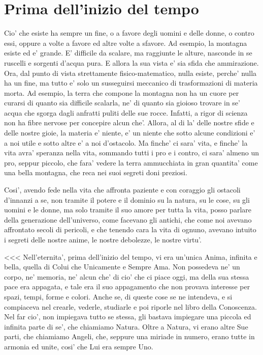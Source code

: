 \section{Prima dell'inizio del tempo}
Cio' che esiste ha sempre un fine, o a favore degli uomini e delle donne, o contro essi, oppure a volte a favore ed altre volte a sfavore. Ad esempio, la montagna esiste ed e' grande. E' difficile da scalare, ma raggiunte le alture, nasconde in se ruscelli e sorgenti d'acqua pura. E allora la sua vista e' sia sfida che ammirazione. Ora, dal punto di vista strettamente fisico-matematico, nulla esiste, perche' nulla ha un fine, ma tutto e' solo un susseguirsi meccanico di trasformazioni di materia morta.
Ad esempio, la terra che compone la montagna non ha un cuore per curarsi di quanto sia difficile scalarla, ne' di quanto sia gioioso trovare in se' acqua che sgorga dagli anfratti puliti delle sue rocce. Infatti, a rigor di scienza non ha fibre nervose per concepire alcun che'. Allora, al di la' delle nostre sfide e delle nostre gioie, la materia e' niente, e' un niente che sotto alcune condizioni e' a noi utile e sotto altre e' a noi d'ostacolo. Ma finche' ci sara' vita, e finche' la vita avra' speranza nella vita, sommando tutti i pro e i contro, ci sara' almeno un pro, seppur piccolo, che fara' vedere la terra ammucchiata in gran quantita' come una bella montagna, che reca nei suoi segreti doni preziosi.

Cosi', avendo fede nella vita che affronta paziente e con coraggio gli ostacoli d'innanzi a se, non tramite il potere e il dominio su la natura, su le cose, su gli uomini e le donne, ma solo tramite il suo amore per tutta la vita, posso parlare della generazione dell'universo, come facevano gli antichi, che come noi avevano affrontato secoli di pericoli, e che tenendo cara la vita di ognuno, avevano intuito i segreti delle nostre anime, le nostre debolezze, le nostre virtu'.

<<<
  Nell'eternita', prima dell'inizio del tempo, vi era un'unica Anima, infinita e bella, quella di Colui che Unicamente e Sempre Ama. Non possedeva ne' un corpo, ne' memoria, ne' alcun che' di cio' che ci piace oggi, ma della sua stessa pace era appagata, e tale era il suo appagamento che non provava interesse per spazi, tempi, forme e colori. Anche se, di queste cose se ne intendeva, e si compiaceva nel crearle, vederle, studiarle e poi riporle nel libro della Conoscenza. Nel far  cio', non impiegava tutto se stessa, gli bastava impiegare una piccola ed infinita parte di se', che chiamiamo Natura. Oltre a Natura, vi erano altre Sue parti, che chiamiamo Angeli, che, seppure una miriade in numero, erano tutte in armonia ed unite, cosi' che Lui era sempre Uno.

